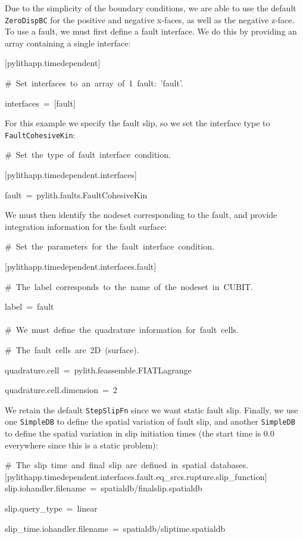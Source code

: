 Due to the simplicity of the boundary conditions, we are able to use
the default \texttt{ZeroDispBC} for the positive and negative x-faces,
as well as the negative z-face. To use a fault, we must first define
a fault interface. We do this by providing an array containing a single
interface:
\begin{lyxcode}
{[}pylithapp.timedependent{]}

\#~Set~interfaces~to~an~array~of~1~fault:~'fault'.

interfaces~=~{[}fault{]}~
\end{lyxcode}
For this example we specify the fault slip, so we set the interface
type to \texttt{FaultCohesiveKin}:
\begin{lyxcode}
\#~Set~the~type~of~fault~interface~condition.

{[}pylithapp.timedependent.interfaces{]}

fault~=~pylith.faults.FaultCohesiveKin~
\end{lyxcode}
We must then identify the nodeset corresponding to the fault, and
provide integration information for the fault surface:
\begin{lyxcode}
\#~Set~the~parameters~for~the~fault~interface~condition.

{[}pylithapp.timedependent.interfaces.fault{]}

\#~The~label~corresponds~to~the~name~of~the~nodeset~in~CUBIT.

label~=~fault~\\
~\\


\#~We~must~define~the~quadrature~information~for~fault~cells.

\#~The~fault~cells~are~2D~(surface).

quadrature.cell~=~pylith.feassemble.FIATLagrange

quadrature.cell.dimension~=~2~
\end{lyxcode}
We retain the default \texttt{StepSlipFn} since we want static fault
slip. Finally, we use one \texttt{SimpleDB} to define the spatial
variation of fault slip, and another \texttt{SimpleDB} to define the
spatial variation in slip initiation times (the start time is 0.0
everywhere since this is a static problem):
\begin{lyxcode}
\#~The~slip~time~and~final~slip~are~defined~in~spatial~databases.~\\
{[}pylithapp.timedependent.interfaces.fault.eq\_srcs.rupture.slip\_function{]}~\\
slip.iohandler.filename~=~spatialdb/finalslip.spatialdb

slip.query\_type~=~linear

slip\_time.iohandler.filename~=~spatialdb/sliptime.spatialdb~
\end{lyxcode}
